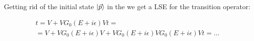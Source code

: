     Getting rid of the initial state $\ket{\vec{p}}$ in the  we get a LSE
    for the transition operator:

    \begin{eqnarray}
        t = V + V G_0(E + i\epsilon)V t = \nonumber\\
        = V + V G_0(E + i\epsilon) V + V G_0(E + i\epsilon) V G_0(E + i\epsilon)V t = ...
    \end{eqnarray}












